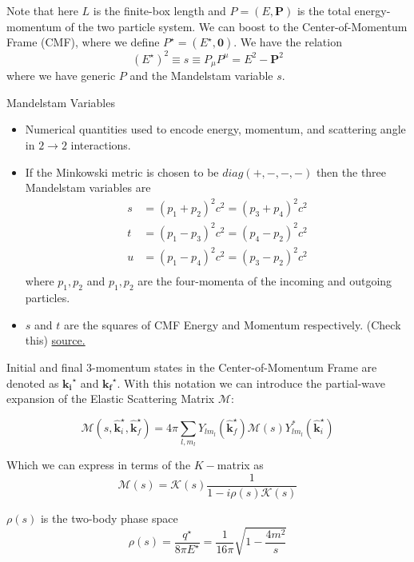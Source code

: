 \documentclass{article}
\newcommand{\ki}{\hat{\mathbf{k}}_i^{\star}}
\newcommand{\kf}{\hat{\mathbf{k}}_f^{\star}}
\newcommand{\M}{\mathcal{M}}
\newcommand{\K}{\mathcal{K}}
\begin{document}
\vskip 0.5cm

Note that here $L$ is the finite-box length and $P = (E, \mathbf{P})$ is the total energy-momentum of the two particle system. We can boost to the Center-of-Momentum Frame (CMF), where we define $P^{\star} = (E^{\star}, \mathbf{0})$. We have the relation 
\[ (E^{\star})^2 \equiv s \equiv P_{\mu}P^{\mu} = E^2 - \mathbf{P}^2 \]
where we have generic $P$ and the Mandelstam variable $s$. 

\begin{mathdefinitionbox}{Mandelstam Variables}
  \begin{itemize}
    \item Numerical quantities used to encode energy, momentum, and scattering angle in $2 \rightarrow 2$ interactions. 
    
    \item If the Minkowski metric is chosen to be $diag(+, -, -, -)$ then the three Mandelstam variables are 
    \begin{align*}
      s &= (p_1 + p_2)^2 c^2 = (p_3 + p_4)^2 c^2 \\
      t &= (p_1 - p_3)^2 c^2 = (p_4 - p_2)^2 c^2 \\
      u &= (p_1 - p_4)^2 c^2 = (p_3 - p_2)^2 c^2 \\
    \end{align*}
    where $p_1, p_2$ and $p_1, p_2$ are the four-momenta of the incoming and outgoing particles.

    \item $s$ and $t$ are the squares of CMF Energy and Momentum respectively. (Check this)
    \href{https://en.wikipedia.org/wiki/Mandelstam_variables}{source.}
  \end{itemize}
\end{mathdefinitionbox}

\vskip 0.5cm
Initial and final 3-momentum states in the Center-of-Momentum Frame are denoted as $\mathbf{k_i}^{\star}$ and $\mathbf{k_f}^{\star}$. With this notation we can introduce the partial-wave expansion of the Elastic Scattering Matrix $\mathcal{M}$:

\[ \M (s, \ki, \kf) = 4\pi \sum_{l ,m_l} Y_{l m_l} (\kf) \M(s) Y_{l m_l}^{*}(\ki) \]

Which we can express in terms of the $K-$matrix as
\[ \M(s) = \K(s) \frac{1}{1 - i \rho(s) \K(s)} \]

$\rho(s)$ is the two-body phase space 
\[ \rho(s) = \frac{q^{\star}}{8\pi E^{\star}} = \frac{1}{16\pi}\sqrt{1 - \frac{4m^2}{s}} \]
\end{document}
